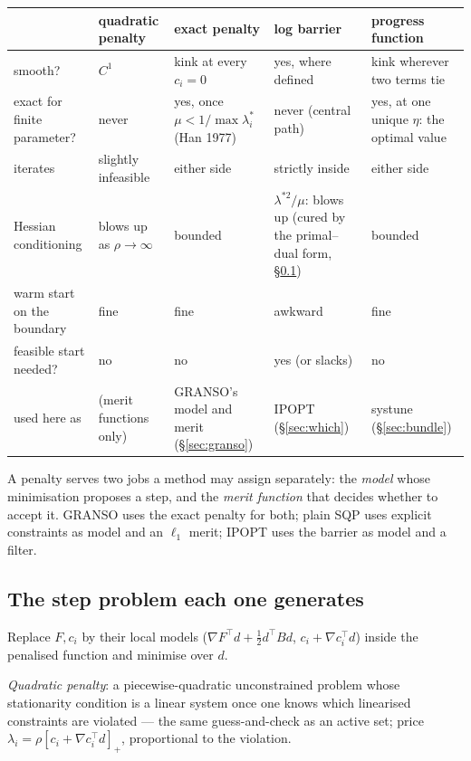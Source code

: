 \documentclass[11pt,a4paper]{article}
\newcommand{\T}{^{\!\top}}
\newcommand{\revb}[1]{#1}
\newcommand{\revd}[1]{#1}
\begin{document}
\begin{center}\small
\begin{tabular}{p{}p{}p{}p{}p{}}
\toprule
 & quadratic penalty & exact penalty & log barrier & progress function\\
\midrule
smooth? & $C^1$ & kink at every $c_i=0$ & yes, where defined & \revb{kink wherever two terms tie}\\
exact for finite parameter? & never & yes, once $\mu<1/\max\lambda_i^\ast$ (Han 1977) & never (central path) & \revd{yes, at one unique $\eta$: the optimal value}\\
iterates & slightly infeasible & either side & strictly inside & \revb{either side}\\
Hessian conditioning & blows up as $\rho\to\infty$ & bounded & $\lambda^{\ast2}/\mu$: blows up (cured by the primal--dual form, \S\ref{sec:stepproblems}) & \revb{bounded}\\
warm start on the boundary & fine & fine & awkward & \revb{fine}\\
feasible start needed? & no & no & yes (or slacks) & \revb{no}\\
used here as & (merit functions only) & GRANSO's model and merit (\S\ref{sec:granso}) & IPOPT (\S\ref{sec:which}) & \revb{systune (\S\ref{sec:bundle})}\\
\bottomrule
\end{tabular}
\end{center}
A penalty serves two jobs a method may assign separately: the \emph{model} whose
minimisation proposes a step, and the \emph{merit function} that decides whether to
accept it.  GRANSO uses the exact penalty for both; plain SQP uses explicit constraints
as model and an $\ell_1$ merit; IPOPT uses the barrier as model and a filter.

\subsection{The step problem each one generates}\label{sec:stepproblems}
Replace $F,c_i$ by their local models ($\nabla F\T d+\tfrac12d\T Bd$,
$c_i+\nabla c_i\T d$) inside the penalised function and minimise over $d$.

\emph{Quadratic penalty}: a piecewise-quadratic unconstrained problem whose stationarity
condition is a linear system once one knows which linearised constraints are violated
--- the same guess-and-check as an active set; price $\lambda_i=\rho[c_i+\nabla c_i\T d]_+$,
proportional to the violation.
\end{document}
